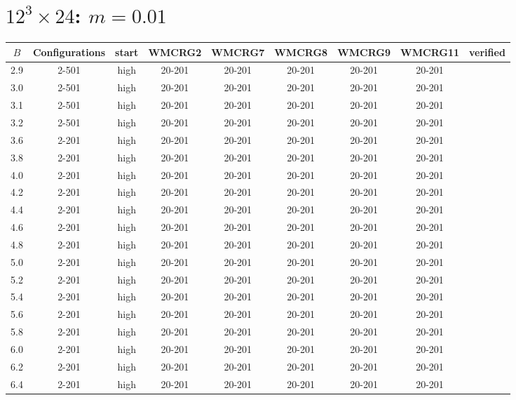 \documentclass{article}
\begin{document}
  \section*{$12^3\times24$:  $m=0.01$}
    \begin{center}
    \begin{tabular}{| c | c | c | c | c | c | c | c | c |}
      \hline
      $B$ & Configurations & start & WMCRG2 & WMCRG7 & WMCRG8 & WMCRG9 & WMCRG11 & verified\\
      \hline
      2.9 & 2-501 & high & 20-201 & 20-201 & 20-201 & 20-201 & 20-201 &\\
      3.0 & 2-501 & high & 20-201 & 20-201 & 20-201 & 20-201 & 20-201 &\\
      3.1 & 2-501 & high & 20-201 & 20-201 & 20-201 & 20-201 & 20-201 &\\
      3.2 & 2-501 & high & 20-201 & 20-201 & 20-201 & 20-201 & 20-201 &\\
      3.6 & 2-201 & high & 20-201 & 20-201 & 20-201 & 20-201 & 20-201 &\\
      3.8 & 2-201 & high & 20-201 & 20-201 & 20-201 & 20-201 & 20-201 &\\
      4.0 & 2-201 & high & 20-201 & 20-201 & 20-201 & 20-201 & 20-201 &\\
      4.2 & 2-201 & high & 20-201 & 20-201 & 20-201 & 20-201 & 20-201 &\\
      4.4 & 2-201 & high & 20-201 & 20-201 & 20-201 & 20-201 & 20-201 &\\
      4.6 & 2-201 & high & 20-201 & 20-201 & 20-201 & 20-201 & 20-201 &\\
      4.8 & 2-201 & high & 20-201 & 20-201 & 20-201 & 20-201 & 20-201 &\\
      5.0 & 2-201 & high & 20-201 & 20-201 & 20-201 & 20-201 & 20-201 &\\
      5.2 & 2-201 & high & 20-201 & 20-201 & 20-201 & 20-201 & 20-201 &\\
      5.4 & 2-201 & high & 20-201 & 20-201 & 20-201 & 20-201 & 20-201 &\\
      5.6 & 2-201 & high & 20-201 & 20-201 & 20-201 & 20-201 & 20-201 &\\
      5.8 & 2-201 & high & 20-201 & 20-201 & 20-201 & 20-201 & 20-201 &\\
      6.0 & 2-201 & high & 20-201 & 20-201 & 20-201 & 20-201 & 20-201 &\\
      6.2 & 2-201 & high & 20-201 & 20-201 & 20-201 & 20-201 & 20-201 &\\
      6.4 & 2-201 & high & 20-201 & 20-201 & 20-201 & 20-201 & 20-201 &\\

\end{tabular}
\end{center}
\end{document}
